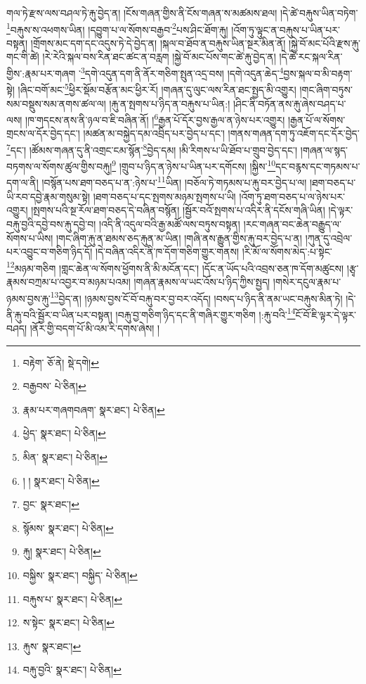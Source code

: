 གལ་ཏེ་རྫས་ལས་བཤལ་ཏེ་རྐུ་བྱེད་ན། །ངོས་གཞན་གྱིས་ནི་ངོས་གཞན་ས་མཚམས་ཐལ། །དེ་ཚེ་བརྐུས་ཡིན་བཏེག་\footnote{བརྟེག་  ཅོ་ནེ།  སྡེ་དགེ། }བརྐུས་ས་འཕགས་ཡིན། །དབྱུག་པ་ལ་སོགས་བརྒྱབ་\footnote{བརྒྱབས་  པེ་ཅིན། }པས་ཤིང་ཐོག་རྐུ། །འོག་ཏུ་ལྟུང་ན་བརྐུས་པ་ཡིན་པར་བསྟན། །གྲོགས་མང་དག་དང་འདུས་ཏེ་དེ་བྱེད་ན། །སྐལ་བ་ཐོབ་ན་བརྐུས་ཡིན་སྔར་མིན་ནོ། །སྐྱེ་བོ་མང་པོའི་རྫས་རྐུ་གང་གི་ཚེ། །རེ་རེའི་སྐལ་བས་རིན་ཐང་ཚང་ན་བརླག །སྐྱེ་བོ་མང་པོས་གང་ཚེ་རྐུ་བྱེད་ན། །དེ་ཚེ་རང་སྐལ་རིན་གྱིས་:རྣམ་པར་གཞག ་\footnote{རྣམ་པར་གཞགབཞག་  སྣར་ཐང་།  པེ་ཅིན། }དགེ་འདུན་དག་ནི་ནོར་གཅིག་སྤུན་འདྲ་བས། །དགེ་འདུན་ཆེད་\footnote{ཕྱེད་  སྣར་ཐང་།  པེ་ཅིན། }བྱས་སྐལ་བ་མི་བརྟག་སྟེ། །ཞིང་བགོ་མང་\footnote{མིན་  སྣར་ཐང་།  པེ་ཅིན། }ཕྱིར་སྡོམ་བརྩོན་མང་ཕྱིར་རོ། །གཞན་དུ་ལུང་ལས་རིན་ཐང་སྤྱད་མི་འགྱུར། །གང་ཞིག་བཏུས་སམ་བསྡུས་སམ་ནགས་ཚལ་ལ། །རྐུ་ན་སྤགས་པ་ཉིད་ན་བརྐུས་པ་ཡིན:། །ཤིང་ནི་བཏོན་ནས་རྐུ་ཞེས་བཤད་པ་ལས། །ཁ་གདངས་ནས་ནི་ཉལ་བ་ཇི་བཞིན་ནོ། །\footnote{། །  སྣར་ཐང་།  པེ་ཅིན། }རྒྱན་པོ་དོར་བྱས་རྒྱལ་ན་ཉེས་པར་འགྱུར། །རྒྱན་པོ་ལ་སོགས་གྲངས་ལ་དོར་བྱེད་དང་། །མཚན་མ་བསྐྱེད་དམ་འབྲིད་པར་བྱེད་པ་དང་། །གནས་གཞན་དག་ཏུ་འཇོག་དང་དོར་བྱེད་\footnote{བྱང་  སྣར་ཐང་། }དང་། །ཚོམས་གཞན་དུ་ནི་འགྲང་ངམ་སྙོན་\footnote{སྙོམས་  སྣར་ཐང་།  པེ་ཅིན། }བྱེད་དམ། །མི་རིགས་པ་ཡི་ཐོབ་པ་གྲུབ་བྱེད་དང་། །གཞན་ལ་སྙད་བཏགས་ལ་སོགས་ཚུལ་གྱིས་བརྐུ།\footnote{རྐུ།  སྣར་ཐང་།  པེ་ཅིན། } །གྲུབ་པ་ཉིད་ན་ཉེས་པ་ཡིན་པར་དགོངས། །སྐྱིས་\footnote{བསྐྱིས་  སྣར་ཐང་། བསྐྱིད་  པེ་ཅིན། }དང་བརྙས་དང་གཏམས་པ་དག་ལ་ནི། །བསྙོན་པས་ཐག་བཅད་པ་ན་:ཉེས་པ་\footnote{བརྐུས་པ་  སྣར་ཐང་།  པེ་ཅིན། }ཡིན། །བཅོལ་ཏེ་གཏམས་པ་རྐུ་བར་བྱེད་པ་ལ། །ཐག་བཅད་པ་ཡི་རབ་དབྱེ་རྣམ་གསུམ་སྟེ། །ཐག་བཅད་པ་དང་སྤགས་མཉམ་སྤགས་པ་ཡི། །འོག་ཏུ་ཐག་བཅད་པ་ལ་ཉེས་པར་འགྱུར། །སྤགས་པའི་སྔ་རོལ་ཐག་བཅད་དེ་བཞིན་བསྙོན། །སྦྱོར་བའོ་སྤགས་པ་འདིར་ནི་དངོས་གཞི་ཡིན། །དེ་ལྟར་བརྐུ་བྱའི་དབྱེ་བས་རྐུ་དབྱེ་བ། །འདི་ནི་འདུལ་བའི་རྒྱ་མཚོ་ལས་བཏུས་བསྟན། །རང་གཞན་བང་ཆེན་བརྒྱུད་ལ་སོགས་པ་ཡིས། །གང་ཞིག་རྐུ་ན་ཐམས་ཅད་རྐུན་མ་ཡིན། །གཞི་ནས་རྒྱུན་གྱིས་རྐུ་བར་བྱེད་པ་ན། །ཀུན་དུ་འབྲེལ་པར་འབྱུང་བ་གཅིག་ཉིད་དོ། །དེ་བཞིན་འདིར་ནི་ཁ་དོག་གཅིག་གྱུར་གནས། །རི་མོ་ལ་སོགས་མེད་:པ་སྟེང་\footnote{ས་སྟེང་  སྣར་ཐང་།  པེ་ཅིན། }མཉམ་གཅིག །གླང་ཆེན་ལ་སོགས་ཕྱོགས་ནི་མི་མངོན་དང་། །དོང་ན་ཡོད་པའི་འབྲས་ཅན་ཁ་དོག་མཚུངས། །རྩྭ་རྣམས་བཀྲམ་པ་འབྱར་བ་མཉམ་པའམ། །གཞན་རྣམས་ལ་ཡང་འོས་པ་ཉིད་ཀྱིས་སྤྱད། །གསེར་དངུལ་རྣམ་པ་ཉམས་བྱས་རྐུ་\footnote{རྐུས་  སྣར་ཐང་། }བྱེད་ན། །ཉམས་བྱས་ངོ་བོ་བརྐུ་བར་བྱ་བར་འདོད། །བསད་པ་ཉིད་ནི་ནམ་ཡང་བརྐུས་མིན་ཏེ། །དེ་ནི་རྐུ་བའི་སྦྱོར་བ་ཡིན་པར་བསྟན། །བརྐུ་བྱ་གཅིག་ཉིད་དང་ནི་གཞིར་གྱུར་གཅིག །:རྐུ་བའི་\footnote{བརྐུ་བྱའི་  སྣར་ཐང་།  པེ་ཅིན། }ངོ་བོ་ཇི་ལྟར་དེ་ལྟར་བཤད། །ནོར་གྱི་བདག་པོ་མི་འམ་རི་དགས་ཞེས། །
